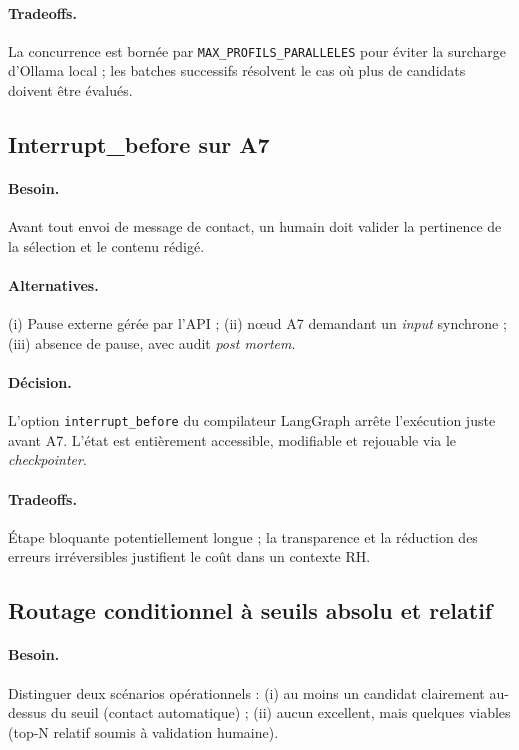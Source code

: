 \paragraph{Tradeoffs.} La concurrence est bornée par \texttt{MAX\_PROFILS\_PARALLELES} pour éviter la surcharge d'Ollama local ; les batches successifs résolvent le cas où plus de candidats doivent être évalués.

\subsection{Interrupt\_before sur A7}

\paragraph{Besoin.} Avant tout envoi de message de contact, un humain doit valider la pertinence de la sélection et le contenu rédigé.

\paragraph{Alternatives.} (i) Pause externe gérée par l'API ; (ii) nœud A7 demandant un \textit{input} synchrone ; (iii) absence de pause, avec audit \textit{post mortem}.

\paragraph{Décision.} L'option \texttt{interrupt\_before} du compilateur LangGraph arrête l'exécution juste avant A7. L'état est entièrement accessible, modifiable et rejouable via le \textit{checkpointer}.

\paragraph{Tradeoffs.} Étape bloquante potentiellement longue ; la transparence et la réduction des erreurs irréversibles justifient le coût dans un contexte RH.

\subsection{Routage conditionnel à seuils absolu et relatif}

\paragraph{Besoin.} Distinguer deux scénarios opérationnels : (i) au moins un candidat clairement au-dessus du seuil (contact automatique) ; (ii) aucun excellent, mais quelques viables (top-N relatif soumis à validation humaine).

